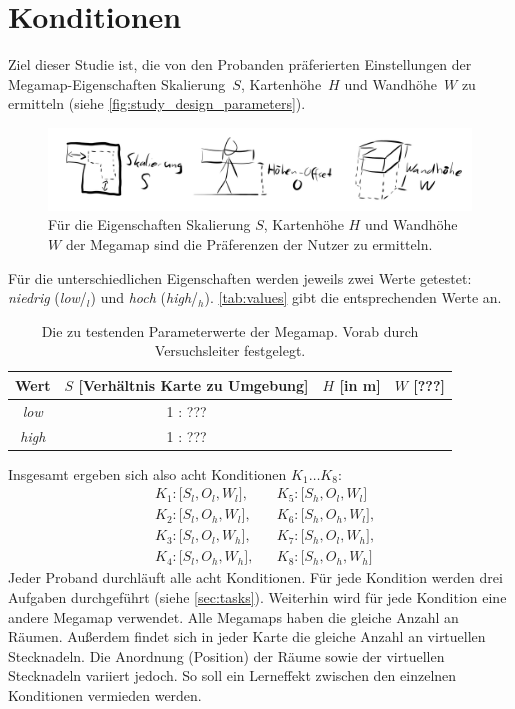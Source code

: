 \documentclass[
    draft=false,
    paper=a4,
    fontsize=11pt,
    twoside=false,
    captions=tableheading,
    british, ngerman,
]{scrartcl}
\begin{document}
\section{Konditionen}
\label{sec:conditions}
Ziel dieser Studie ist, die von den Probanden prä\-fe\-rier\-ten Einstellungen der Megamap-Ei\-gen\-schaf\-ten Skalierung\ $S$, Kartenhöhe\ $H$ und Wandhöhe\ $W$ zu ermitteln (siehe \autoref{fig:study_design_parameters}).
\begin{figure}[p]
    \centering
    \includegraphics[width=\textwidth]{study_design_parameters}
    \caption{Für die Eigenschaften Skalierung $S$, Kartenhöhe $H$ und Wandhöhe $W$ der Megamap sind die Präferenzen der Nutzer zu ermitteln.}
    \label{fig:study_design_parameters}
\end{figure}
Für die unterschiedlichen Eigenschaften werden jeweils zwei Werte getestet: \emph{niedrig} (\emph{low}/$_l$) und \emph{hoch} (\emph{high}/$_h$).
\autoref{tab:values} gibt die entsprechenden Werte an.
\begin{table}[hb]
    \centering
    \caption{Die zu testenden Parameterwerte der Megamap. %
    Vorab durch Versuchsleiter festgelegt.}
    \label{tab:values}
    \begin{tabular}{cccc}
        Wert & $S$ [Verhältnis Karte zu Umgebung] & $H$ [in \si{\meter}] & $W$ [???] \\\toprule
        \emph{low} & 1 : ??? & & \\\midrule
        \emph{high} & 1 : ??? & & \\\bottomrule
    \end{tabular}
\end{table}

Insgesamt ergeben sich also acht Konditionen $K_1 \dots K_8$:
\begin{align*}
    &K_1: \lbrack S_l, O_l, W_l \rbrack, && K_5: \lbrack S_h, O_l, W_l \rbrack\\
    &K_2: \lbrack S_l, O_h, W_l \rbrack, && K_6: \lbrack S_h, O_h, W_l \rbrack,\\
    &K_3: \lbrack S_l, O_l, W_h \rbrack, && K_7: \lbrack S_h, O_l, W_h \rbrack,\\
    &K_4: \lbrack S_l, O_h, W_h \rbrack, && K_8: \lbrack S_h, O_h, W_h \rbrack
\end{align*}
Jeder Proband durchläuft alle acht Konditionen.
Für jede Kondition werden drei Aufgaben durchgeführt (siehe \autoref{sec:tasks}).
Weiterhin wird für jede Kondition eine andere Megamap verwendet.
Alle Megamaps haben die gleiche Anzahl an Räumen.
Außerdem findet sich in jeder Karte die gleiche Anzahl an virtuellen Stecknadeln.
Die Anordnung (Position) der Räume sowie der virtuellen Stecknadeln variiert jedoch.
So soll ein Lerneffekt zwischen den einzelnen Konditionen vermieden werden.
\end{document}
